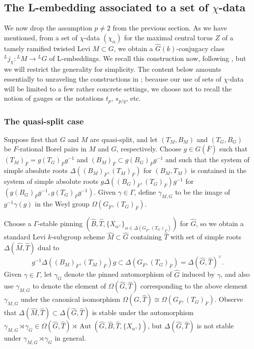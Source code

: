 \documentclass[reqno]{amsart}
\numberwithin{equation}{subsection}
\newcommand{\ol}[1]{\overline{#1}}
\newcommand{\wh}[1]{\widehat{#1}}
\newcommand{\co}{\colon}
\newcommand{\ld}{{}^L}
\DeclareMathOperator{\Aut}{Aut}
\theoremstyle{remark}
\numberwithin{equation}{subsection}
\numberwithin{figure}{subsection}
\begin{document}
\subsection{The L-embedding associated to a set of $\chi$-data}\label{ss:l-embedding-defn}

We now drop the assumption $p \neq 2$ from the previous section.
As we have mentioned, from a set of $\chi$-data $(\chi_\alpha)$ for the maximal central torus $Z$ of a tamely ramified twisted Levi $M \subset G$, we obtain a $\wh G(k)$-conjugacy class $\ld j_\chi\co \ld M \to \ld G$ of L-embeddings. We recall this construction now, following \cite[\S\S 3.3, 3.4, 6.1]{Kal21a}, but we will restrict the generality for simplicity. The content below amounts essentially to unraveling the constructions in \cite{Kal21a}; because our use of sets of $\chi$-data will be limited to a few rather concrete settings, we choose not to recall the notion of gauges or the notations $t_p$, $s_{p/q}$, etc.

\subsubsection{The quasi-split case}\label{sss:quasi-split-l-embedding}
Suppose first that $G$ and $M$ are quasi-split, and let $(T_M, B_M)$ and $(T_G, B_G)$ be $F$-rational Borel pairs in $M$ and $G$, respectively. Choose $g \in G(\ol F)$ such that $(T_M)_{\ol F} = g(T_G)_{\ol F}g^{-1}$ and $(B_M)_{\ol F} \subset g(B_G)_{\ol F}g^{-1}$ and such that the system of simple absolute roots $\Delta((B_M)_{\ol F}, (T_M)_{\ol F})$ for $(B_M, T_M)$ is contained in the system of simple absolute roots $g\Delta((B_G)_{\ol F}, (T_G)_{\ol F})g^{-1}$ for $(g(B_G)_{\ol F}g^{-1}, g(T_G)_{\ol F}g^{-1})$. Given $\gamma \in \Gamma$, define $\gamma_{M,G}$ to be the image of $g^{-1}\gamma(g)$ in the Weyl group $\Omega(G_{\ol F}, (T_G)_{\ol F})$.

Choose a $\Gamma$-stable pinning $(\wh B, \wh T, \{X_{\alpha^\vee}\}_{\alpha \in \Delta(G_{\ol F}, (T_G)_{\ol F})})$ for $\wh G$, so we obtain a standard Levi $k$-subgroup scheme $\wh M \subset \wh G$ containing $\wh T$ with set of simple roots $\Delta(\wh M, \wh T)$ dual to 
\[
g^{-1}\Delta((B_M)_{\ol F}, (T_M)_{\ol F})g \subset \Delta(G_{\ol F}, (T_G)_{\ol F}) = \Delta(\wh G, \wh T)^\vee.
\]
Given $\gamma \in \Gamma$, let $\gamma_G$ denote the pinned automorphism of $\wh G$ induced by $\gamma$, and also use $\gamma_{M, G}$ to denote the element of $\Omega(\wh G, \wh T)$ corresponding to the above element $\gamma_{M, G}$ under the canonical isomorphism $\Omega(\wh G, \wh T) \cong \Omega(G_{\ol F}, (T_G)_{\ol F})$. Observe that $\Delta(\wh M, \wh T) \subset \Delta(\wh G, \wh T)$ is stable under the automorphism $\gamma_{M, G} \rtimes \gamma_G \in \Omega(\wh G, \wh T) \rtimes \Aut(\wh G, \wh B, \wh T, \{X_{\alpha^\vee}\})$, but $\Delta(\wh G, \wh T)$ is not stable under $\gamma_{M, G} \rtimes \gamma_G$ in general.
\end{document}
